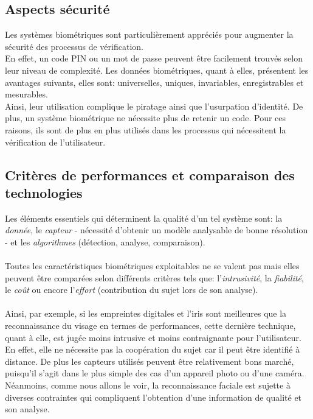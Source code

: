 \subsection{Aspects sécurité}
Les systèmes biométriques sont particulièrement appréciés pour augmenter la sécurité des processus de vérification.
\\En effet, un code PIN ou un mot de passe peuvent être facilement trouvés selon leur niveau de complexité. Les données biométriques, quant à elles, présentent les avantages suivants, elles sont: universelles, uniques, invariables, enregistrables et mesurables.
\\Ainsi, leur utilisation complique le piratage ainsi que l'usurpation d'identité. De plus, un système biométrique ne nécessite plus de retenir un code. Pour ces raisons, ils sont de plus en plus utilisés dans les processus qui nécessitent la vérification de l'utilisateur.

\subsection{Critères de performances et comparaison des technologies}
Les éléments essentiels qui déterminent la qualité d'un tel système sont: la \textit{donnée}, le \textit{capteur} - nécessité d'obtenir un modèle analysable de bonne résolution - et les \textit{algorithmes} (détection, analyse, comparaison).
\paragraph{}
Toutes les caractéristiques biométriques exploitables ne se valent pas mais elles peuvent être comparées selon différents critères tels que: l'\textit{intrusivité}, la \textit{fiabilité}, le \textit{coût} ou encore l'\textit{effort} (contribution du sujet lors de son analyse).
\paragraph{}
Ainsi, par exemple, si les empreintes digitales et l'iris sont meilleures que la reconnaissance du visage en termes de performances, cette dernière technique, quant à elle, est jugée moins intrusive et moins contraignante pour l'utilisateur. En effet, elle ne nécessite pas la coopération du sujet car il peut être identifié à distance. De plus les capteurs utilisés peuvent être relativement bons marché, puisqu'il s'agit dans le plus simple des cas d'un appareil photo ou d'une caméra.
\\Néanmoins, comme nous allons le voir, la reconnaissance faciale est sujette à diverses contraintes qui compliquent l'obtention d'une information de qualité et son analyse.

